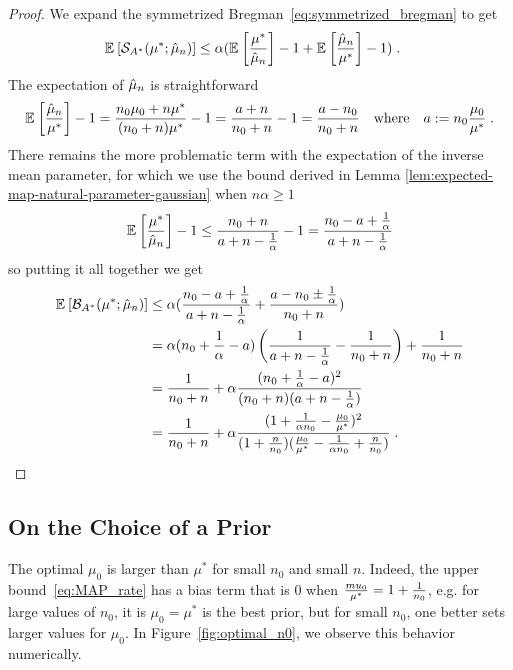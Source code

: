 \begin{subappendices}
\begin{proof}
We expand the symmetrized Bregman~\eqref{eq:symmetrized_bregman} to get
\begin{align}
	\mathbb{E}_{} \left[ {\mathcal S}_{A^*}(\mu^*; \hat {\mu}_n) \right]  
	&\leq \alpha (\mathbb{E}_{} \left[ \frac{\mu^*}{\hat {\mu}_n} \right]  -1  + \mathbb{E}_{} \left[ \frac{\hat {\mu}_n}{\mu^*} \right]  - 1) \; .
\end{align}
The expectation of $\hat {\mu}_n$ is straightforward
\begin{align}
	 \mathbb{E}_{} \left[ \frac{\hat {\mu}_n}{\mu^*} \right]  - 1 
	 = \frac{n_0 \mu_0 + n \mu^*}{(n_0+n)\mu^*} - 1 
	 = \frac{a+n}{n_0+n} - 1 = \frac{a - n_0}{n_0+n}
	 \quad \text{where} \quad
	 a:=n_0\frac{\mu_0}{\mu^*} \; .
\end{align}
There remains the more problematic term with the expectation of the inverse mean parameter, 
for which we use the bound derived in Lemma \ref{lem:expected-map-natural-parameter-gaussian}  when $n\alpha \geq 1$
\begin{align}
	\mathbb{E}_{} \left[ \frac{\mu^*}{\hat {\mu}_n} \right]  - 1 
	\leq \frac{n_0 + n}{a +n - \frac{1}{\alpha}} -1
	= \frac{n_0 - a + \frac{1}{\alpha}}{a +n - \frac{1}{\alpha}}
\end{align}
so putting it all together we get 
\begin{align}
	\mathbb{E}_{} \left[ {\mathcal B}_{A^*}(\mu^*; \hat {\mu}_n) \right]  
	&\leq 
	\alpha (\frac{n_0 - a + \frac{1}{\alpha}}{a +n - \frac{1}{\alpha}} 
	 + \frac{a - n_0 \pm \frac{1}{\alpha}}{n_0+n}) \\
	 &=
	 \alpha (n_0 + \frac{1}{\alpha} -a)  
	 \left( \frac{1}{a+n-\frac{1}{\alpha}} - \frac{1}{n_0+n} \right)
	 + \frac{1}{n_0 + n} \\
	 &= \frac{1}{n_0 + n} + \alpha \frac{(n_0 + \frac{1}{\alpha} - a)^2}{(n_0 + n)(a+ n - \frac{1}{\alpha} )} \\
	&= \frac{1}{n_0 + n} + \alpha \frac{(1 + \frac{1}{\alpha n_0} - \frac{\mu_0}{\mu^*})^2}{ (1 + \frac{n}{n_0} ) (\frac{\mu_0}{\mu^*} - \frac{1}{\alpha n_0} +\frac{n}{n_0})} \; .
\end{align}
\end{proof}



\subsection{On the Choice of a Prior}
\label{app:prior-choice}
The optimal $\mu_0$ is larger than $\mu^*$ for small $n_0$ and small $n$.
Indeed, the upper bound~\eqref{eq:MAP_rate} has a bias term that is $0$ when $\frac{mu_0}{\mu^*} = 1 + \frac{1}{n_0}$, e.g. for large values of $n_0$, it is $\mu_0=\mu^*$ is the best prior, but for small $n_0$, one better sets larger values for $\mu_0$. In Figure~\ref{fig:optimal_n0}, we observe this behavior numerically.


\end{subappendices}
